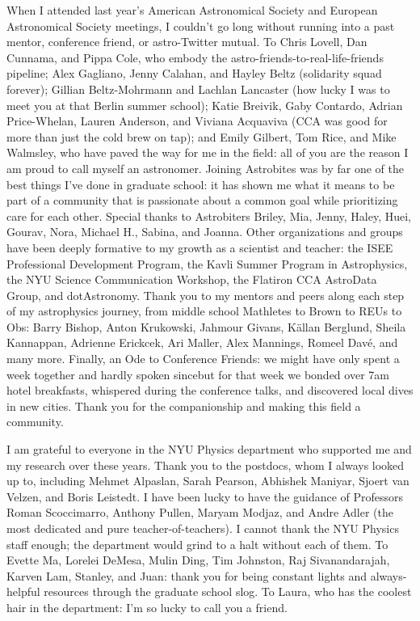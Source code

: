 When I attended last year's American Astronomical Society and European Astronomical Society meetings, I couldn't go long without running into a past mentor, conference friend, or astro-Twitter mutual.
To Chris Lovell, Dan Cunnama, and Pippa Cole, who embody the astro-friends-to-real-life-friends pipeline; Alex Gagliano, Jenny Calahan, and Hayley Beltz (solidarity squad forever); Gillian Beltz-Mohrmann and Lachlan Lancaster (how lucky I was to meet you at that Berlin summer school); Katie Breivik, Gaby Contardo, Adrian Price-Whelan, Lauren Anderson, and Viviana Acquaviva (CCA was good for more than just the cold brew on tap); and Emily Gilbert, Tom Rice, and Mike Walmsley, who have paved the way for me in the field: all of you are the reason I am proud to call myself an astronomer.
Joining Astrobites was by far one of the best things I've done in graduate school: it has shown me what it means to be part of a community that is passionate about a common goal while prioritizing care for each other. Special thanks to Astrobiters Briley, Mia, Jenny, Haley, Huei, Gourav, Nora, Michael H., Sabina, and Joanna.
Other organizations and groups have been deeply formative to my growth as a scientist and teacher: the ISEE Professional Development Program, the Kavli Summer Program in Astrophysics, the NYU Science Communication Workshop, the Flatiron CCA AstroData Group, and dotAstronomy. 
Thank you to my mentors and peers along each step of my astrophysics journey, from middle school Mathletes to Brown to REUs to Obs: Barry Bishop, Anton Krukowski, Jahmour Givans, K\"allan Berglund, Sheila Kannappan, Adrienne Erickcek,  Ari Maller, Alex Mannings, Romeel Dav\'e, and many more.
Finally, an Ode to Conference Friends: we might have only spent a week together and hardly spoken since{\emdash}but for that week we bonded over 7am hotel breakfasts, whispered during the conference talks, and discovered local dives in new cities.
Thank you for the companionship and making this field a community.

I am grateful to everyone in the NYU Physics department who supported me and my research over these years.
Thank you to the postdocs, whom I always looked up to, including Mehmet Alpaslan, Sarah Pearson, Abhishek Maniyar, Sjoert van Velzen, and Boris Leistedt.
I have been lucky to have the guidance of Professors Roman Scoccimarro, Anthony Pullen, Maryam Modjaz, and Andre Adler (the most dedicated and pure teacher-of-teachers).
I cannot thank the NYU Physics staff enough; the department would grind to a halt without each of them.
To Evette Ma, Lorelei DeMesa, Mulin Ding, Tim Johnston, Raj Sivanandarajah, Karven Lam, Stanley, and Juan: thank you for being constant lights and always-helpful resources through the graduate school slog.
To Laura, who has the coolest hair in the department: I'm so lucky to call you a friend.

